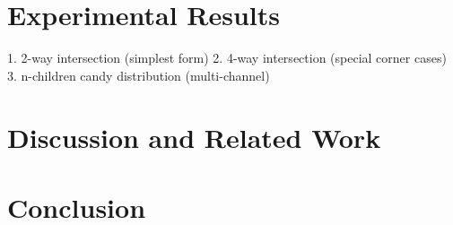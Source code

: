 \documentclass[conference]{IEEEtran}
\begin{document}

\section{Experimental Results}
1. 2-way intersection (simplest form)
2. 4-way intersection (special corner cases)
3. n-children candy distribution (multi-channel)


\section{Discussion and Related Work}




\section{Conclusion}


\end{document}
